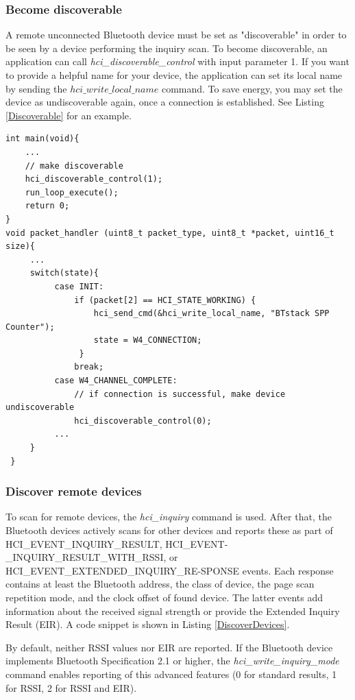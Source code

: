 \subsubsection{Become discoverable}
A remote unconnected Bluetooth device must be set as "discoverable" in order to be seen by a device performing the inquiry scan. To become discoverable, an application can call \emph{hci\_discoverable\_control}  with input parameter 1. If you want to provide a helpful name for your device, the application can set its local name by sending the $hci\_write\_local\_name$ command. To save energy, you may set the device as undiscoverable again, once a connection is established. See Listing \ref{Discoverable} for an example.

\begin{lstlisting}[caption=Setting device as discoverable. OFF by default., label=Discoverable]
int main(void){
    ... 
    // make discoverable
    hci_discoverable_control(1);
    run_loop_execute(); 
    return 0;
}
void packet_handler (uint8_t packet_type, uint8_t *packet, uint16_t size){
     ...
     switch(state){
          case INIT:
              if (packet[2] == HCI_STATE_WORKING) {
                  hci_send_cmd(&hci_write_local_name, "BTstack SPP Counter");
                  state = W4_CONNECTION;
               }
              break;
          case W4_CHANNEL_COMPLETE:
              // if connection is successful, make device undiscoverable
              hci_discoverable_control(0);
          ...
     }
 }
\end{lstlisting}


\subsubsection{Discover remote devices}
\label{section:DiscoverDevices}
To scan for remote devices, the \emph{hci\_inquiry} command is used. After that, the Bluetooth devices actively scans for other devices and reports these as part of HCI\_EVENT\_INQUIRY\_RESULT, HCI\_EVENT-\_INQUIRY\_RESULT\_WITH\_RSSI, or HCI\_EVENT\_EXTENDED\_INQUIRY\_RE-SPONSE events. Each response contains at least the Bluetooth address, the class of device, the page scan repetition mode, and the clock offset of found device. The latter events add information about the received signal strength or provide the Extended Inquiry Result (EIR). A code snippet is shown in Listing \ref{DiscoverDevices}.

By default, neither RSSI values nor EIR are reported. If the Bluetooth device implements Bluetooth Specification 2.1 or higher, the \emph{hci\_write\_inquiry\_mode} command enables reporting of this advanced features (0 for standard results, 1 for RSSI, 2 for RSSI and EIR). 


